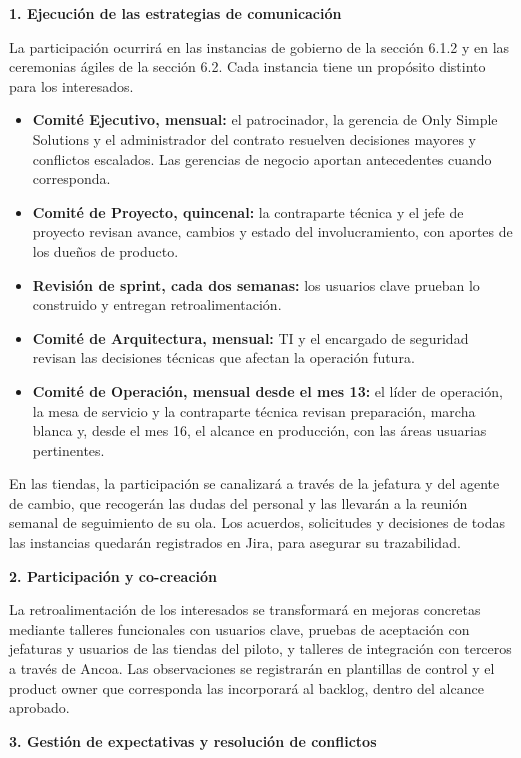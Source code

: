 \documentclass[11pt]{article}
\begin{document}
\textbf{1. Ejecución de las estrategias de comunicación}

La participación ocurrirá en las instancias de gobierno de la sección
6.1.2 y en las ceremonias ágiles de la sección 6.2. Cada instancia tiene
un propósito distinto para los interesados.

\begin{itemize}
\item
  \textbf{Comité Ejecutivo, mensual:} el patrocinador, la gerencia de
  Only Simple Solutions y el administrador del contrato resuelven
  decisiones mayores y conflictos escalados. Las gerencias de negocio
  aportan antecedentes cuando corresponda.
\item
  \textbf{Comité de Proyecto, quincenal:} la contraparte técnica y el
  jefe de proyecto revisan avance, cambios y estado del involucramiento,
  con aportes de los dueños de producto.
\item
  \textbf{Revisión de sprint, cada dos semanas:} los usuarios clave
  prueban lo construido y entregan retroalimentación.
\item
  \textbf{Comité de Arquitectura, mensual:} TI y el encargado de
  seguridad revisan las decisiones técnicas que afectan la operación
  futura.
\item
  \textbf{Comité de Operación, mensual desde el mes 13:} el líder de
  operación, la mesa de servicio y la contraparte técnica revisan
  preparación, marcha blanca y, desde el mes 16, el alcance en
  producción, con las áreas usuarias pertinentes.
\end{itemize}

En las tiendas, la participación se canalizará a través de la jefatura y
del agente de cambio, que recogerán las dudas del personal y las
llevarán a la reunión semanal de seguimiento de su ola. Los acuerdos,
solicitudes y decisiones de todas las instancias quedarán registrados en
Jira, para asegurar su trazabilidad.

\textbf{2. Participación y co-creación}

La retroalimentación de los interesados se transformará en mejoras
concretas mediante talleres funcionales con usuarios clave, pruebas de
aceptación con jefaturas y usuarios de las tiendas del piloto, y
talleres de integración con terceros a través de Ancoa. Las
observaciones se registrarán en plantillas de control y el product owner
que corresponda las incorporará al backlog, dentro del alcance aprobado.

\textbf{3. Gestión de expectativas y resolución de conflictos}
\end{document}
